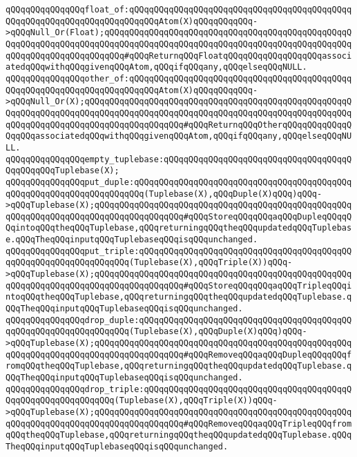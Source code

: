 \verb|qQQqqQQqqQQqqQQqfloat_of:qQQqqQQqqQQqqQQqqQQqqQQqqQQqqQQqqQQqqQQqqQQqqQQqqQQqqQQqqQQqqQQqqQQqqQQqqQQqAtom(X)qQQqqQQqqQQq->qQQqNull_Or(Float);qQQqqQQqqQQqqQQqqQQqqQQqqQQqqQQqqQQqqQQqqQQqqQQqqQQqqQQqqQQqqQQqqQQqqQQqqQQqqQQqqQQqqQQqqQQqqQQqqQQqqQQqqQQqqQQqqQQqqQQqqQQqqQQqqQQqqQQqqQQqqQQq#qQQqReturnqQQqFloatqQQqqQQqqQQqqQQqqQQqassociatedqQQqwithqQQqgivenqQQqAtom,qQQqifqQQqany,qQQqelseqQQqNULL.|\newline
\verb|qQQqqQQqqQQqqQQqother_of:qQQqqQQqqQQqqQQqqQQqqQQqqQQqqQQqqQQqqQQqqQQqqQQqqQQqqQQqqQQqqQQqqQQqqQQqqQQqAtom(X)qQQqqQQqqQQq->qQQqNull_Or(X);qQQqqQQqqQQqqQQqqQQqqQQqqQQqqQQqqQQqqQQqqQQqqQQqqQQqqQQqqQQqqQQqqQQqqQQqqQQqqQQqqQQqqQQqqQQqqQQqqQQqqQQqqQQqqQQqqQQqqQQqqQQqqQQqqQQqqQQqqQQqqQQqqQQqqQQqqQQqqQQq#qQQqReturnqQQqOtherqQQqqQQqqQQqqQQqqQQqassociatedqQQqwithqQQqgivenqQQqAtom,qQQqifqQQqany,qQQqelseqQQqNULL.|\newline
\newline
\verb|qQQqqQQqqQQqqQQqempty_tuplebase:qQQqqQQqqQQqqQQqqQQqqQQqqQQqqQQqqQQqqQQqqQQqqQQqTuplebase(X);|\newline
\newline
\verb|qQQqqQQqqQQqqQQqput_duple:qQQqqQQqqQQqqQQqqQQqqQQqqQQqqQQqqQQqqQQqqQQqqQQqqQQqqQQqqQQqqQQqqQQqqQQq(Tuplebase(X),qQQqDuple(X)qQQq)qQQq->qQQqTuplebase(X);qQQqqQQqqQQqqQQqqQQqqQQqqQQqqQQqqQQqqQQqqQQqqQQqqQQqqQQqqQQqqQQqqQQqqQQqqQQqqQQqqQQqqQQq#qQQqStoreqQQqqQQqaqQQqDupleqQQqqQQqintoqQQqtheqQQqTuplebase,qQQqreturningqQQqtheqQQqupdatedqQQqTuplebase.qQQqTheqQQqinputqQQqTuplebaseqQQqisqQQqunchanged.|\newline
\verb|qQQqqQQqqQQqqQQqput_triple:qQQqqQQqqQQqqQQqqQQqqQQqqQQqqQQqqQQqqQQqqQQqqQQqqQQqqQQqqQQqqQQqqQQq(Tuplebase(X),qQQqTriple(X))qQQq->qQQqTuplebase(X);qQQqqQQqqQQqqQQqqQQqqQQqqQQqqQQqqQQqqQQqqQQqqQQqqQQqqQQqqQQqqQQqqQQqqQQqqQQqqQQqqQQqqQQq#qQQqStoreqQQqqQQqaqQQqTripleqQQqintoqQQqtheqQQqTuplebase,qQQqreturningqQQqtheqQQqupdatedqQQqTuplebase.qQQqTheqQQqinputqQQqTuplebaseqQQqisqQQqunchanged.|\newline
\newline
\verb|qQQqqQQqqQQqqQQqdrop_duple:qQQqqQQqqQQqqQQqqQQqqQQqqQQqqQQqqQQqqQQqqQQqqQQqqQQqqQQqqQQqqQQqqQQq(Tuplebase(X),qQQqDuple(X)qQQq)qQQq->qQQqTuplebase(X);qQQqqQQqqQQqqQQqqQQqqQQqqQQqqQQqqQQqqQQqqQQqqQQqqQQqqQQqqQQqqQQqqQQqqQQqqQQqqQQqqQQqqQQq#qQQqRemoveqQQqaqQQqDupleqQQqqQQqfromqQQqtheqQQqTuplebase,qQQqreturningqQQqtheqQQqupdatedqQQqTuplebase.qQQqTheqQQqinputqQQqTuplebaseqQQqisqQQqunchanged.|\newline
\verb|qQQqqQQqqQQqqQQqdrop_triple:qQQqqQQqqQQqqQQqqQQqqQQqqQQqqQQqqQQqqQQqqQQqqQQqqQQqqQQqqQQqqQQq(Tuplebase(X),qQQqTriple(X))qQQq->qQQqTuplebase(X);qQQqqQQqqQQqqQQqqQQqqQQqqQQqqQQqqQQqqQQqqQQqqQQqqQQqqQQqqQQqqQQqqQQqqQQqqQQqqQQqqQQqqQQq#qQQqRemoveqQQqaqQQqTripleqQQqfromqQQqtheqQQqTuplebase,qQQqreturningqQQqtheqQQqupdatedqQQqTuplebase.qQQqTheqQQqinputqQQqTuplebaseqQQqisqQQqunchanged.|\newline
